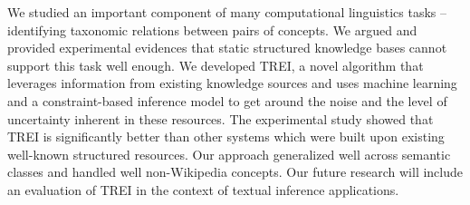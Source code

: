 We studied an important component of many computational linguistics
tasks -- identifying taxonomic relations between pairs of concepts. We
argued and provided experimental evidences that static structured
knowledge bases cannot support this task well enough. We developed
TREI, a novel algorithm that leverages information from existing
knowledge sources and uses machine learning and a constraint-based
inference model to get around the noise and the level of uncertainty
inherent in these resources. The experimental study showed that TREI
is significantly better than other systems which were built upon
existing well-known structured resources. Our approach generalized
well across semantic classes and handled well non-Wikipedia
concepts. Our future research will include an evaluation of TREI in
the context of textual inference applications.


  

